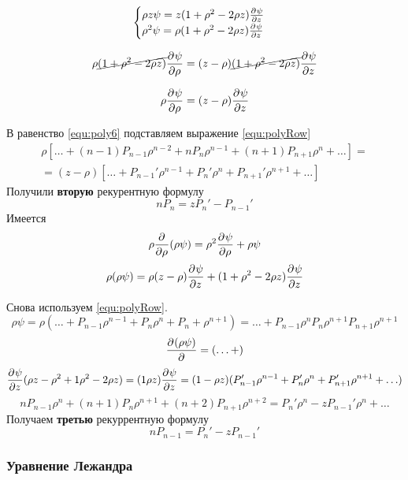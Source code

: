 \[
\begin{cases}
   \rho z \psi = z (1 + \rho^2 - 2 \rho z) \frac{\partial^{}\psi}{\partial z^{}}\\
   \rho^2 \psi = \rho (1 + \rho^2 - 2 \rho z) \frac{\partial^{}\psi}{\partial z^{}}
\end{cases}
\]

\[
    \rho \cancel{(1 + \rho^2 - 2 \rho z)} \frac{\partial^{}\psi}{\partial \rho^{}} = (z - \rho) \cancel{(1 + \rho^2 - 2 \rho z)} \frac{\partial^{}\psi}{\partial z^{}}
\]

\begin{equation}
    \rho \frac{\partial^{}\psi}{\partial \rho^{}} = (z - \rho) \frac{\partial^{}\psi}{\partial z^{}}
	\label{equ:poly6}
\end{equation}

В равенство \eqref{equ:poly6} подставляем выражение \eqref{equ:polyRow} 
\begin{multline*}
    \rho \left[\ldots + (n - 1) P_{n - 1} \rho^{n - 2} + n P_n \rho^{n - 1} + (n + 1) P_{n + 1} \rho^n + \ldots \right] =\\ = (z - \rho)\left[\ldots + P_{n - 1}' \rho^{n - 1} + P_n' \rho^n + P_{n +1}' \rho^{n + 1} + \ldots \right]
\end{multline*}
Получили \textbf{вторую} рекурентную формулу
\begin{equation}
    n P_n = zP_n' - P_{n - 1}'
	\label{equ:poly7}
\end{equation}
Имеется
\[
    \rho \frac{\partial^{}}{\partial \rho^{}} (\rho \psi) = \rho^2 \frac{\partial^{}\psi}{\partial \rho^{}} + \rho \psi
\]
\[
    \rho (\rho \psi) = \rho (z - \rho) \frac{\partial^{}\psi}{\partial z^{}} + (1 + \rho^2 - 2 \rho z) \frac{\partial^{}\psi}{\partial z^{}}
\]

Снова используем \eqref{equ:polyRow}.
\[
    \rho \psi = \rho (\ldots + P_{n - 1} \rho^{n - 1} + P_n \rho^n + P_n + \rho^{n + 1}) = \ldots + P_{n - 1} \rho^{n } P_n \rho^{n + 1} P_{n + 1}\rho^{n + 1}
\]
\[ 
    \frac{\partial^{}(\rho \psi)}{\partial ^{}} = (\ldots + )
\]
\[
    \frac{\partial^{}\psi}{\partial z^{}} (\rho z - \rho^2+ 1 \rho^2 - 2 \rho z) = (1 \rho z) \frac{\partial^{}\psi}{\partial z^{}} = (1 - \rho z) (P_{n - 1}' \rho^{n - 1} + P_n' \rho^n + P_{n + 1}' \rho^{n+1} + \ldots)
\]
\[
    n P_{n - 1}\rho^n + (n + 1) P_n \rho^{n + 1} + (n + 2) P_{n + 1} \rho^{n + 2} = P_n' \rho^n - z P_{n - 1}' \rho^n + \ldots
\]
Получаем \textbf{третью} рекуррентную формулу
\begin{equation}
    n P_{n - 1} = P_n' - z P_{n - 1}'
	\label{equ:poly8}
\end{equation}
\subsubsection{Уравнение Лежандра}


